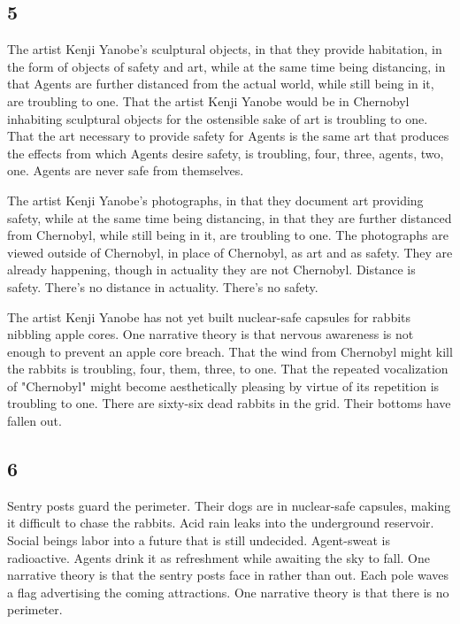 \hypertarget{section-6}{%
\subsection{5}\label{section-6}}

The artist Kenji Yanobe's sculptural objects, in that they provide
habitation, in the form of objects of safety and art, while at the same
time being distancing, in that Agents are further distanced from the
actual world, while still being in it, are troubling to one. That the
artist Kenji Yanobe would be in Chernobyl inhabiting sculptural objects
for the ostensible sake of art is troubling to one. That the art
necessary to provide safety for Agents is the same art that produces the
effects from which Agents desire safety, is troubling, four, three,
agents, two, one. Agents are never safe from themselves.

The artist Kenji Yanobe's photographs, in that they document art
providing safety, while at the same time being distancing, in that they
are further distanced from Chernobyl, while still being in it, are
troubling to one. The photographs are viewed outside of Chernobyl, in
place of Chernobyl, as art and as safety. They are already happening,
though in actuality they are not Chernobyl. Distance is safety. There's
no distance in actuality. There's no safety.

The artist Kenji Yanobe has not yet built nuclear-safe capsules for
rabbits nibbling apple cores. One narrative theory is that nervous
awareness is not enough to prevent an apple core breach. That the wind
from Chernobyl might kill the rabbits is troubling, four, them, three,
to one. That the repeated vocalization of "Chernobyl" might become
aesthetically pleasing by virtue of its repetition is troubling to one.
There are sixty-six dead rabbits in the grid. Their bottoms have fallen
out.

\hypertarget{section-7}{%
\subsection{6}\label{section-7}}

Sentry posts guard the perimeter. Their dogs are in nuclear-safe
capsules, making it difficult to chase the rabbits. Acid rain leaks into
the underground reservoir. Social beings labor into a future that is
still undecided. Agent-sweat is radioactive. Agents drink it as
refreshment while awaiting the sky to fall. One narrative theory is that
the sentry posts face in rather than out. Each pole waves a flag
advertising the coming attractions. One narrative theory is that there
is no perimeter.

